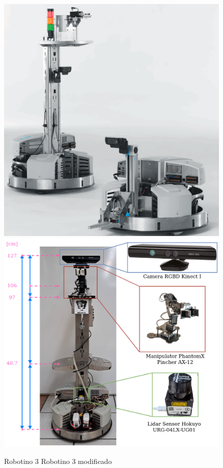             \begin{figure}[ht]
                \centering
                \includegraphics[scale=0.3]{Figures/RobotinoFESTO_base+torre.png}\quad \includegraphics[scale=0.17]{Figures/Festino2023_medidas.png}                
                    \caption{Robotino 3 \cite{festo-didactic-robotino-2013} \qquad\qquad\quad\phantom{-}\qquad Robotino 3 modificado}
                    \label{fig:Robotino}
            \end{figure}
                            
